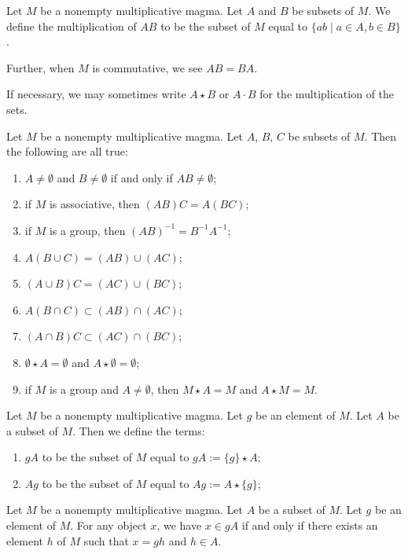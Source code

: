 \begin{definition}
Let $M$ be a nonempty multiplicative magma. Let $A$ and $B$ be subsets of $M$.
We define the multiplication of $AB$ to be the subset of $M$ equal to
$\{ab\mid a\in A,b\in B\}$.

Further, when $M$ is commutative, we see $AB=BA$.

If necessary, we may sometimes write $A\star B$ or $A\cdot B$ for the
multiplication of the sets.
\end{definition}

\begin{theorem}
Let $M$ be a nonempty multiplicative magma.
Let $A$, $B$, $C$ be subsets of $M$. Then the following are all true:
\begin{enumerate}
\item $A\neq\emptyset$ and $B\neq\emptyset$ if and only if $AB\neq\emptyset$;
\item if $M$ is associative, then $(AB)C=A(BC)$;
\item if $M$ is a group, then $(AB)^{-1}=B^{-1}A^{-1}$;
\item $A(B\cup C)=(AB)\cup(AC)$;
\item $(A\cup B)C=(AC)\cup(BC)$;
\item $A(B\cap C)\subset(AB)\cap(AC)$;
\item $(A\cap B)C\subset(AC)\cap(BC)$;
\item $\emptyset\star A=\emptyset$ and $A\star\emptyset=\emptyset$;
\item if $M$ is a group and $A\neq\emptyset$, then $M\star A=M$ and
  $A\star M=M$.
\end{enumerate}
\end{theorem}

\begin{definition}
Let $M$ be a nonempty multiplicative magma.
Let $g$ be an element of $M$.
Let $A$ be a subset of $M$.
Then we define the terms:
\begin{enumerate}
\item $gA$ to be the subset of $M$ equal to $gA := \{g\}\star A$;
\item $Ag$ to be the subset of $M$ equal to $Ag := A\star\{g\}$;
\end{enumerate}
\end{definition}

\begin{theorem}
Let $M$ be a nonempty multiplicative magma.
Let $A$ be a subset of $M$.
Let $g$ be an element of $M$.
For any object $x$, we have $x\in gA$ if and only if there exists an
element $h$ of $M$ such that $x=gh$ and $h\in A$.
\end{theorem}

